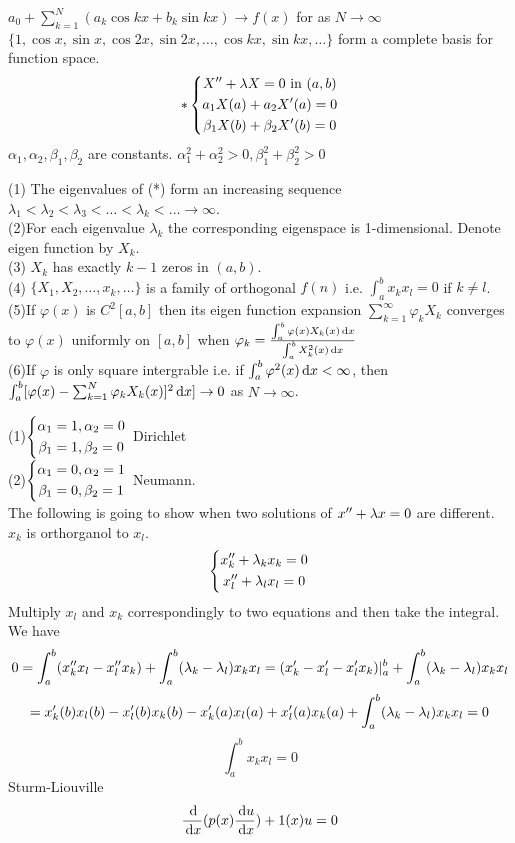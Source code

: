 $a_0+\sum_{k=1}^N(a_k\cos kx+b_k\sin kx)\rightarrow f(x)$ for as $N\rightarrow \infty$  $\{1,\cos x,\sin x,\cos 2x,\sin 2x,\dots,\cos kx,\sin kx,\dots\}$ form a complete basis for function space.\\
\[*\left\{\begin{gathered}X^{\prime\prime}+\lambda X=0  \text{ in }(a,b)\\a_1X(a)+a_2X^{\prime}(a)=0\\\beta_1X(b)+\beta_2X^{\prime}(b)=0\end{gathered}\right.
\]
$\alpha_1, \alpha_2, \beta_1, \beta_2$ are constants. $\alpha_1^2+\alpha_2^2>0,  \beta_1^2+\beta_2^2>0$
\begin{theorem}
(1) The eigenvalues of (*) form an increasing sequence $\lambda_1<\lambda_2<\lambda_3<\dots<\lambda_k<\dots\rightarrow \infty $.\\
(2)For each eigenvalue $\lambda_k$ the corresponding eigenspace is 1-dimensional. Denote eigen function by $X_k$.\\
(3) $X_k$ has exactly $k-1$ zeros in $(a,b)$.\\
(4) $\{X_1, X_2, \dots, x_k,\dots\}$ is a family of orthogonal $f(n)$ i.e. $\int_a^b x_kx_l=0$ if $k\neq l$.\\
(5)If $\varphi(x)$ is $C^2[a,b]$ then its eigen function expansion $\sum_{k=1}^\infty \varphi_k X_k$ converges to $\varphi(x)$ uniformly on $[a,b]$ when $\varphi_k=\frac{\int_a^b\varphi(x)X_k(x)\,\mathrm{d} x}{\int_a^bX_k^2(x)\,\mathrm{d} x}$\\
(6)If $\varphi$ is only square intergrable i.e. if $\int_a^b\varphi^2(x)\,\mathrm{d} x<\infty$, then $\int_a^b[\varphi(x)-\sum_{k=1}^N\varphi_kX_k(x)]^2\,\mathrm{d} x]\rightarrow 0$ as $N\rightarrow \infty$.


\end{theorem}
(1)$\left\{\begin{gathered}\alpha_1=1, \alpha_2=0\\\beta_1=1, \beta_2 =0\end{gathered}\right.$ Dirichlet\\
(2)$\left\{\begin{gathered}\alpha_1=0,\alpha_2=1\\\beta_1=0, \beta_2=1\end{gathered}\right.$ Neumann.\\
The following is going to show when two solutions of $x^{\prime\prime}+\lambda x=0$ are different. $x_k$ is orthorganol to $x_l$.\\
\[\left\{\begin{gathered}x_k^{\prime\prime}+\lambda_kx_k=0\\x_l^{\prime\prime}+\lambda_lx_l=0\end{gathered}\right.
\]
Multiply $x_l$ and $x_k$ correspondingly to two equations and then take the integral. We have
\[0=\int_a^b(x_k^{\prime\prime} x_l-x_l^{\prime\prime} x_k)+\int_a^b(\lambda_k-\lambda_l)x_kx_l=(x_k^{\prime}-x_l^{\prime}-x_l^{\prime} x_k)|_a^b+\int_a^b(\lambda_k-\lambda_l)x_kx_l
\]
\[=x_k^{\prime}(b)x_l(b)-x_l^{\prime}(b)x_k(b)-x_k^{\prime}(a)x_l(a)+x_l^{\prime}(a)x_k(a)+\int_a^b(\lambda_k-\lambda_l)x_kx_l=0
\]
\[\int_a^bx_kx_l=0
\]
Sturm-Liouville
\[\frac{\,\mathrm{d}}{\,\mathrm{d} x}(p(x)\frac{\,\mathrm{d} u}{\,\mathrm{d} x})+1(x)u=0
\]






